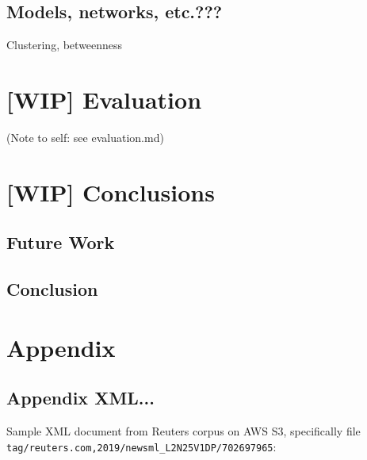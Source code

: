 \documentclass[11pt]{article}
\begin{document}
\subsection{Models, networks, etc.???}

Clustering, betweenness

\section{[WIP] Evaluation}

(Note to self: see evaluation.md)


\section{[WIP] Conclusions}
\subsection{Future Work}
\subsection{Conclusion}


\newpage

\section{Appendix}
\subsection{Appendix XML...}
\label{sec:AppendixXML}
Sample XML document from Reuters corpus on AWS S3, specifically file \lstinline{tag/reuters.com,2019/newsml_L2N25V1DP/702697965}:
\\
\end{document}
